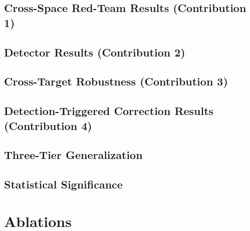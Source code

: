 \documentclass{article}
\begin{document}
\subsection{Cross-Space Red-Team Results (Contribution 1)}

\subsection{Detector Results (Contribution 2)}

\subsection{Cross-Target Robustness (Contribution 3)}

\subsection{Detection-Triggered Correction Results (Contribution 4)}

\subsection{Three-Tier Generalization}
\label{sec:exp:gen}

\subsection{Statistical Significance}

\section{Ablations}
\label{sec:abl}
\end{document}
